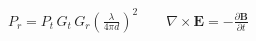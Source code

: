 \documentclass[border=2pt]{standalone}
\begin{document}
$\displaystyle P_r = P_t\,G_t\,G_r\left(\frac{\lambda}{4\pi d}\right)^{2}
\qquad \nabla\times\mathbf{E} = -\frac{\partial\mathbf{B}}{\partial t}$
\end{document}
